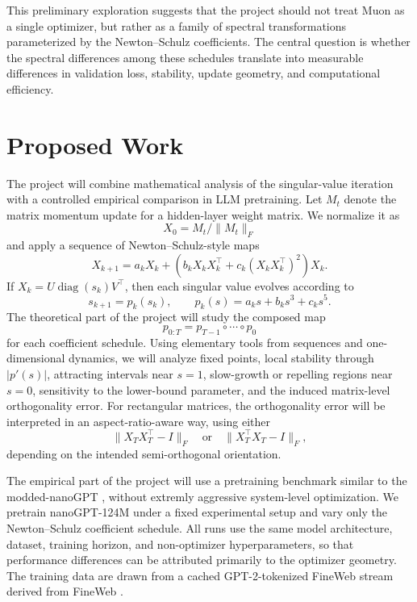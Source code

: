 \documentclass[10pt]{article}
\begin{document}
This preliminary exploration suggests that the project should not treat Muon as a single optimizer, but rather as a family of spectral transformations parameterized by the Newton--Schulz coefficients. The central question is whether the spectral differences among these schedules translate into measurable differences in validation loss, stability, update geometry, and computational efficiency.

\section*{Proposed Work}

The project will combine mathematical analysis of the singular-value iteration with a controlled empirical comparison in LLM pretraining. Let $M_t$ denote the matrix momentum update for a hidden-layer weight matrix. We normalize it as
\[
    X_0 = M_t/\lVert M_t\rVert_F
\]
and apply a sequence of Newton--Schulz-style maps
\[
    X_{k+1}
    =
    a_kX_k
    +
    \left(
        b_kX_kX_k^\top
        +
        c_k(X_kX_k^\top)^2
    \right)X_k .
\]
If $X_k=U\operatorname{diag}(s_k)V^\top$, then each singular value evolves according to
\[
    s_{k+1}
    =
    p_k(s_k),
    \qquad
    p_k(s)=a_ks+b_ks^3+c_ks^5.
\]
The theoretical part of the project will study the composed map
\[
    p_{0:T}=p_{T-1}\circ\cdots\circ p_0
\]
for each coefficient schedule. Using elementary tools from sequences and one-dimensional dynamics, we will analyze fixed points, local stability through $|p'(s)|$, attracting intervals near $s=1$, slow-growth or repelling regions near $s=0$, sensitivity to the lower-bound parameter, and the induced matrix-level orthogonality error. For rectangular matrices, the orthogonality error will be interpreted in an aspect-ratio-aware way, using either
\[
    \lVert X_TX_T^\top-I\rVert_F
    \quad \text{or} \quad
    \lVert X_T^\top X_T-I\rVert_F,
\]
depending on the intended semi-orthogonal orientation.

The empirical part of the project will use a pretraining benchmark similar to the modded-nanoGPT \citep{moddednanogpt2024}, without extremly aggressive system-level optimization. We pretrain nanoGPT-124M under a fixed experimental setup and vary only the Newton--Schulz coefficient schedule. All runs use the same model architecture, dataset, training horizon, and non-optimizer hyperparameters, so that performance differences can be attributed primarily to the optimizer geometry. The training data are drawn from a cached GPT-2-tokenized FineWeb stream derived from FineWeb \citep{penedo2024fineweb}.
\end{document}
